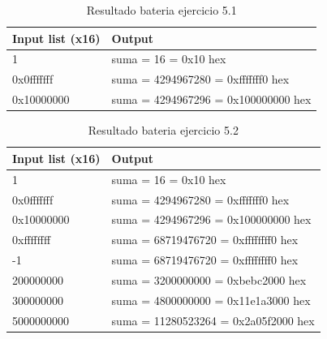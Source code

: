 
	\begin{table}[htbp]
		\begin{center}
			\begin{tabular}{|l|l|}
				\hline
				Input list (x16) & Output \\
				\hline \hline
				1 & suma = 16 = 0x10 hex \\ \hline
				0x0fffffff & suma = 4294967280 = 0xfffffff0 hex \\ \hline
				0x10000000 & suma = 4294967296 = 0x100000000 hex \\ \hline
			\end{tabular}
			\caption{Resultado bateria ejercicio 5.1}
			\label{tabla:sencilla}
		\end{center}
	\end{table}
	
	
	\begin{table}[htbp]
		\begin{center}
			\begin{tabular}{|l|l|}
				\hline
				Input list (x16) & Output \\
				\hline \hline
				1 & suma = 16 = 0x10 hex  \\ \hline
				0x0fffffff & suma = 4294967280 = 0xfffffff0 hex  \\ \hline
				0x10000000 & suma = 4294967296 = 0x100000000 hex \\ \hline
				0xffffffff & suma = 68719476720 = 0xffffffff0 hex \\ \hline
				-1 & suma = 68719476720 = 0xffffffff0 hex \\ \hline
				200000000 & suma = 3200000000 = 0xbebc2000 hex  \\ \hline
				300000000 & suma = 4800000000 = 0x11e1a3000 hex  \\ \hline
				5000000000 & suma = 11280523264 = 0x2a05f2000 hex \\ \hline
			\end{tabular}
			\caption{Resultado bateria ejercicio 5.2}
			\label{tabla:sencilla}
		\end{center}
	\end{table}
	
